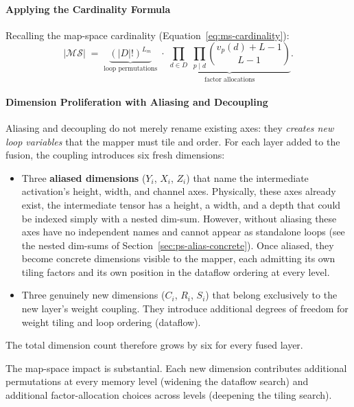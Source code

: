 \paragraph{Applying the Cardinality Formula}
\label{sec:fds-cardinality}

Recalling the map-space cardinality (Equation~\ref{eq:ms-cardinality}):
\[
|\mathcal{MS}|
\;=\;
\underbrace{(|D|!)^{L_m}}_{\text{loop permutations}}
\;\cdot\;
\underbrace{
  \prod_{d \in D}\;\prod_{p \mid d}
    \binom{v_p(d) + L - 1}{L - 1}
}_{\text{factor allocations}}.
\]

\paragraph{Dimension Proliferation with Aliasing and Decoupling}
\label{sec:ps-dim-proliferation}

Aliasing and decoupling do not merely rename existing axes: they \emph{creates new
loop variables} that the mapper must tile and order.
For each layer added to the fusion, the coupling introduces six
fresh dimensions:
%
\begin{itemize}
  \item Three \textbf{aliased dimensions} ($Y_i$, $X_i$, $Z_i$) that
        name the intermediate activation's height, width, and channel
        axes.
        Physically, these axes already exist, the intermediate tensor
        has a height, a width, and a depth that could be indexed simply with a nested dim-sum.
        However, without aliasing these axes have no independent names
        and cannot appear as standalone loops (see the nested
        dim-sums of Section~\ref{sec:ps-alias-concrete}).
        Once aliased, they become concrete dimensions visible to the
        mapper, each admitting its own tiling factors and its own
        position in the dataflow ordering at every level.
  \item Three genuinely new dimensions ($C_i$, $R_i$, $S_i$) that
        belong exclusively to the new layer's weight coupling.
        They introduce additional degrees
        of freedom for weight tiling and loop ordering (dataflow).
\end{itemize}
%
The total dimension count therefore grows by six for every fused
layer.

The map-space impact is substantial.
Each new dimension contributes additional permutations at every memory
level (widening the dataflow search) and additional factor-allocation
choices across levels (deepening the tiling search).


